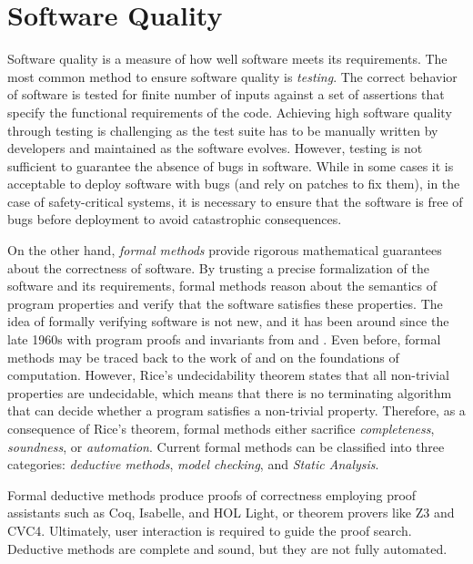\section{Software Quality}

Software quality is a measure of how well software meets its requirements.
The most common method to ensure software quality is \emph{testing}.
The correct behavior of software is tested for finite number of inputs against a set of assertions that specify the functional requirements of the code.
Achieving high software quality through testing is challenging as the test suite has to be manually written by developers and maintained as the software evolves.
However, testing is not sufficient to guarantee the absence of bugs in software.
While in some cases it is acceptable to deploy software with bugs (and rely on patches to fix them), in the case of safety-critical systems, it is necessary to ensure that the software is free of bugs before deployment to avoid catastrophic consequences.

On the other hand, \emph{formal methods} provide rigorous mathematical guarantees about the correctness of software.
By trusting a precise formalization of the software and its requirements, formal methods reason about the semantics of program properties and verify that the software satisfies these properties.
The idea of formally verifying software is not new, and it has been around since the late 1960s with program proofs and invariants from  and .
Even before, formal methods may be traced back to the work of  and  on the foundations of computation.
However, Rice's undecidability theorem  states that all non-trivial properties are undecidable, which means that there is no terminating algorithm that can decide whether a program satisfies a non-trivial property.
Therefore, as a consequence of Rice's theorem, formal methods either sacrifice \emph{completeness}, \emph{soundness}, or \emph{automation}.
Current formal methods can be classified into three categories: \emph{deductive methods}, \emph{model checking}, and \emph{Static Analysis}.

Formal deductive methods produce proofs of correctness employing proof assistants such as Coq, Isabelle, and HOL Light, or theorem provers like Z3 and CVC4.
Ultimately, user interaction is required to guide the proof search. Deductive methods are complete and sound, but they are not fully automated.

